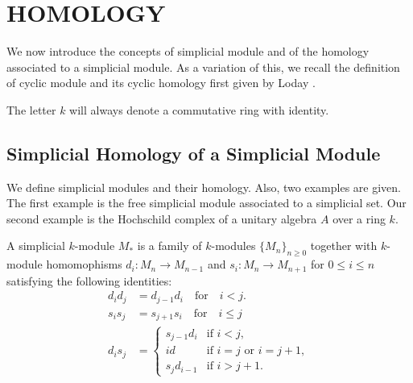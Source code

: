 \section{HOMOLOGY}\label{homology}
%
%
\hspace{\parindent}
We now introduce the concepts of simplicial module and of the homology
associated to a simplicial module.
As a variation of this, we recall the definition of cyclic module and its
cyclic homology first given by Loday \cite{Lodaybook}.

The letter $k$ will always denote a commutative ring with identity.

\subsection{Simplicial Homology of a Simplicial Module}
\hspace{\parindent}
We define simplicial modules and their homology. Also,
two examples are given.
The first example is the free simplicial module associated to a simplicial
set.
Our second example is the Hochschild complex of a unitary algebra $A$ over
a ring $k$. 

\begin{defn}
A simplicial $k$-module $M_*$ is a family of $k$-modules $\{ M_n \}_{n\geq 0}$
together with $k$-module homomophisms
$d_i \colon M_n\rightarrow M_{n-1}$
and
$s_i \colon M_n\rightarrow M_{n+1}$ 
for  $ 0\leq i\leq n$
satisfying the following identities:
\begin{align}
d_id_j&=d_{j-1}d_i \quad \text{for} \quad i<j. \label{eq:faces} 
\\
s_is_j&=s_{j+1}s_i \quad \text{for}\quad i\leq j \label{eq:degeneracies}
\\
d_is_j&=\begin{cases}
        s_{j-1}d_i & \text{if $i< j$}, \\
        id         & \text{if $i=j$ or $i=j+1$}, \\
        s_jd_{i-1} & \text{if $i>j+1$}.
        \end{cases} \label{eq:mix}
\end{align}
\end{defn}

